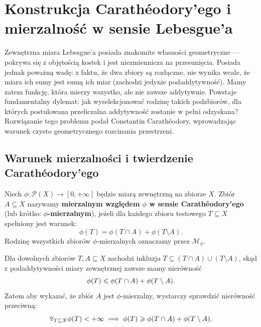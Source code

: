 \section{Konstrukcja Carathéodory'ego i mierzalność w sensie Lebesgue'a}
Zewnętrzna miara Lebesgue'a posiada znakomite własności geometryczne — pokrywa się z objętością kostek i jest niezmiennicza na przesunięcia. Posiada jednak poważną wadę: z faktu, że dwa zbiory są rozłączne, nie wynika wcale, że miara ich sumy jest sumą ich miar (zachodzi jedynie podaddytywność). Mamy zatem funkcję, która mierzy wszystko, ale nie zawsze addytywnie. Powstaje fundamentalny dylemat: jak wyselekcjonować rodzinę takich podzbiorów, dla których postulowana przeliczalna addytywność zostanie w pełni odzyskana? Rozwiązanie tego problemu podał Constantin Carathéodory, wprowadzając warunek czysto geometrycznego rozcinania przestrzeni.

\subsection{Warunek mierzalności i twierdzenie Carathéodory'ego} \begin{defi} Niech $\phi \colon \mathcal{P}(X) \to [0, +\infty]$ będzie miarą zewnętrzną na zbiorze $X$. Zbiór $A \subseteq X$ nazywamy \textbf{mierzalnym względem $\phi$ w sensie Carathéodory'ego} (lub krótko: \textbf{$\phi$-mierzalnym}), jeżeli dla każdego zbioru testowego $T \subseteq X$ spełniony jest warunek:
    \begin{equation}\label{eq:caratheodory_condition}
        \phi(T) = \phi(T \cap A) + \phi(T \setminus A).
    \end{equation}
    Rodzinę wszystkich zbiorów $\phi$-mierzalnych oznaczamy przez $\mathcal{M}_\phi$.
\end{defi}
\begin{uwaga}
    Dla dowolnych zbiorów $T, A \subseteq X$ zachodzi inkluzja $T \subseteq (T \cap A) \cup (T \setminus A)$, skąd z podaddytywności miary zewnętrznej zawsze mamy nierówność
    \begin{equation*}
        \phi(T) \leqslant \phi(T \cap A) + \phi(T \setminus A).
    \end{equation*}
    Zatem aby wykazać, że zbiór $A$ jest $\phi$-mierzalny, wystarczy sprawdzić nierówność przeciwną:
    \begin{equation}\label{eq:carath_reduced}
        \forall_{T \subseteq X} \phi(T) < +\infty \implies \phi(T) \geqslant \phi(T \cap A) + \phi(T \setminus A).
    \end{equation}
\end{uwaga}

